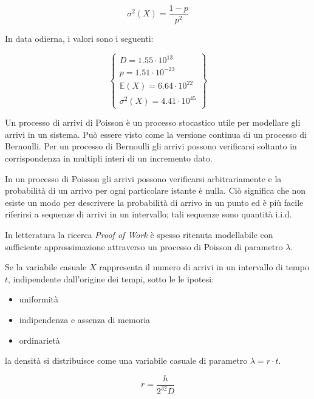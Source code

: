 \documentclass{article}
\begin{document}
\begin{equation}
    \sigma^{2}(X) = \frac{1 - p}{p^2} \label{varianza}
\end{equation}

In data odierna, i valori sono i seguenti:

\begin{equation}
    \left \{
        \begin{array}{ll}
            D = 1.55 \cdot 10^{13} \\
            p = 1.51 \cdot 10^{-23} \\
            \mathbb{E}(X) = 6.64 \cdot 10^{22}\\
            \sigma^{2}(X) = 4.41 \cdot 10^{45}
        \end{array}
    \right  \}
\end{equation}

Un processo di arrivi di Poisson è un processo stocastico utile per modellare gli arrivi in un sistema. Può essere visto come la versione continua di un processo di Bernoulli. Per un processo di Bernoulli gli arrivi possono verificarsi soltanto in corrispondenza in multipli interi di un incremento dato.

In un processo di Poisson gli arrivi possono verificarsi arbitrariamente e la probabilità di un arrivo per ogni particolare istante è nulla. 
Ciò significa che non esiste un modo per descrivere la probabilità di arrivo in un punto ed è più facile riferirsi a sequenze di arrivi in un intervallo; tali sequenze sono quantità i.i.d.

In letteratura la ricerca \textit{Proof of Work} è spesso ritenuta modellabile con sufficiente approssimazione attraverso un processo di Poisson di parametro $\lambda$.

Se la variabile casuale $X$ rappresenta il numero di arrivi in un intervallo di tempo $t$, indipendente dall'origine dei tempi, sotto le le ipotesi:

\begin{itemize}
    \item uniformità
    \item indipendenza e assenza di memoria
    \item ordinarietà
\end{itemize}

la densità si distribuisce come una variabile casuale di parametro $\lambda = r \cdot t$.

\begin{equation}
    r = \frac{h}{2^{32}D} \label{rate}
\end{equation}
\end{document}
